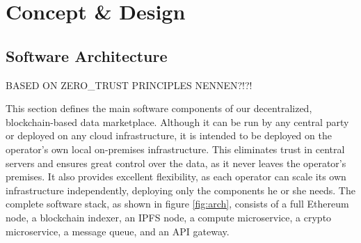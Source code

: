 \chapter{Concept \& Design}
\label{cha:cod}

\section{Software Architecture}
\label{section:software_architecture}

BASED ON ZERO_TRUST PRINCIPLES NENNEN?!?!

This section defines the main software components of our decentralized, blockchain-based data marketplace. Although it can be run by any central party or deployed on any cloud infrastructure, it is intended to be deployed on the operator's own local on-premises infrastructure. This eliminates trust in central servers and ensures great control over the data, as it never leaves the operator's premises. It also provides excellent flexibility, as each operator can scale its own infrastructure independently, deploying only the components he or she needs. The complete software stack, as shown in figure \ref{fig:arch}, consists of a full Ethereum node, a blockchain indexer, an IPFS node, a compute microservice, a crypto microservice, a message queue, and an API gateway.


        

